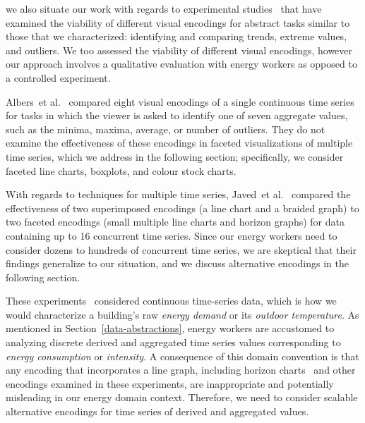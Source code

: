 \documentclass[journal]{vgtc}                %
\newcommand{\bstart}[1]{\vspace{1mm} \noindent{\textbf{#1:}}}
\newcommand{\etal}{et al.}
\begin{document}
\bstart{Evaluating visualizations of time-oriented data} we also situate our work with regards to experimental studies~\cite{Albers2014,Fuchs2013,Javed2010} that have examined the viability of different visual encodings for abstract tasks similar to those that we characterized: identifying and comparing trends, extreme values, and outliers.
We too assessed the viability of different visual encodings, however our approach involves a qualitative evaluation with energy workers as opposed to a controlled experiment.

Albers~\etal~\cite{Albers2014} compared eight visual encodings of a single continuous time series for tasks in which the viewer is asked to identify one of seven aggregate values, such as the minima, maxima, average, or number of outliers. 
They do not examine the effectiveness of these encodings in faceted visualizations of multiple time series, which we address in the following section; specifically, we consider faceted line charts, boxplots, and colour stock charts.

With regards to techniques for multiple time series, Javed~\etal~\cite{Javed2010} compared the effectiveness of two superimposed encodings (a line chart and a braided graph) to two faceted encodings (small multiple line charts and horizon graphs) for data containing up to 16 concurrent time series.
Since our energy workers need to consider dozens to hundreds of concurrent time series, we are skeptical that their findings generalize to our situation, and we discuss alternative encodings in the following section. 

These experiments~\cite{Albers2014,Fuchs2013,Javed2010} considered continuous time-series data, which is how we would characterize a building's raw {\it energy demand} or its {\it outdoor temperature}. 
As mentioned in Section~\ref{data-abstractions}, energy workers are accustomed to analyzing discrete derived and aggregated time series values corresponding to {\it energy consumption} or {\it intensity}.
A consequence of this domain convention is that any encoding that incorporates a line graph, including horizon charts~\cite{Heer2009} and other encodings examined in these experiments, are inappropriate and potentially misleading in our energy domain context.
Therefore, we need to consider scalable alternative encodings for time series of derived and aggregated values.

\end{document}
